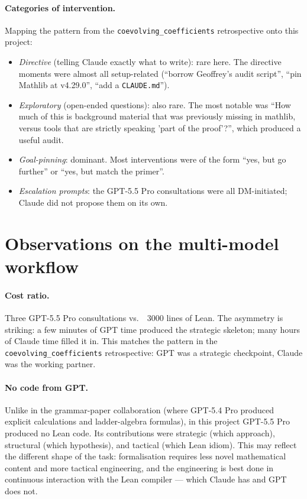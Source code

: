 \documentclass[11pt]{article}
\begin{document}
\paragraph{Categories of intervention.} Mapping the pattern from the
\texttt{coevolving\_coefficients} retrospective onto this project:

\begin{itemize}
\item \emph{Directive} (telling Claude exactly what to write): rare here.
The directive moments were almost all setup-related (``borrow
Geoffrey's audit script'', ``pin Mathlib at v4.29.0'', ``add a
\texttt{CLAUDE.md}'').
\item \emph{Exploratory} (open-ended questions): also rare. The most
notable was ``How much of this is background material that was
previously missing in mathlib, versus tools that are strictly speaking
'part of the proof'?'', which produced a useful audit.
\item \emph{Goal-pinning}: dominant. Most interventions were of the form
``yes, but go further'' or ``yes, but match the primer''.
\item \emph{Escalation prompts}: the GPT-5.5 Pro consultations were all
DM-initiated; Claude did not propose them on its own.
\end{itemize}

\section{Observations on the multi-model workflow}

\paragraph{Cost ratio.} Three GPT-5.5 Pro consultations vs.\ ~3000 lines
of Lean. The asymmetry is striking: a few minutes of GPT time produced
the strategic skeleton; many hours of Claude time filled it in. This
matches the pattern in the \texttt{coevolving\_coefficients}
retrospective: GPT was a strategic checkpoint, Claude was the working
partner.

\paragraph{No code from GPT.} Unlike in the grammar-paper collaboration
(where GPT-5.4 Pro produced explicit calculations and ladder-algebra
formulas), in this project GPT-5.5 Pro produced no Lean code. Its
contributions were strategic (which approach), structural (which
hypothesis), and tactical (which Lean idiom). This may reflect the
different shape of the task: formalisation requires less novel
mathematical content and more tactical engineering, and the engineering
is best done in continuous interaction with the Lean compiler --- which
Claude has and GPT does not.
\end{document}
